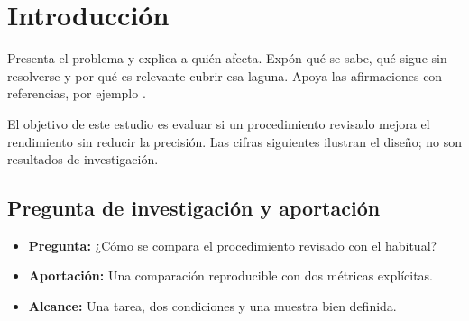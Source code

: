 \section{Introducción}
Presenta el problema y explica a quién afecta. Expón qué se sabe, qué sigue
sin resolverse y por qué es relevante cubrir esa laguna. Apoya las afirmaciones
con referencias, por ejemplo \cite{example}.

El objetivo de este estudio es evaluar si un procedimiento revisado mejora
el rendimiento sin reducir la precisión. Las cifras siguientes ilustran
el diseño; no son resultados de investigación.
\subsection{Pregunta de investigación y aportación}
\begin{itemize}
\item \textbf{Pregunta:} ¿Cómo se compara el procedimiento revisado con el habitual?
\item \textbf{Aportación:} Una comparación reproducible con dos métricas explícitas.
\item \textbf{Alcance:} Una tarea, dos condiciones y una muestra bien definida.
\end{itemize}

